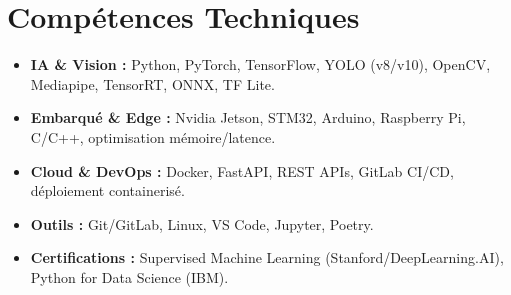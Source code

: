 \documentclass[a4paper,11pt]{article}
\begin{document}
\section{Compétences Techniques}
\begin{itemize}[leftmargin=*, nosep]
    \item \small{\textbf{IA \& Vision :} Python, PyTorch, TensorFlow, YOLO (v8/v10), OpenCV, Mediapipe, TensorRT, ONNX, TF Lite.}
    \item \small{\textbf{Embarqué \& Edge :} Nvidia Jetson, STM32, Arduino, Raspberry Pi, C/C++, optimisation mémoire/latence.}
    \item \small{\textbf{Cloud \& DevOps :} Docker, FastAPI, REST APIs, GitLab CI/CD, déploiement containerisé.}
    \item \small{\textbf{Outils :} Git/GitLab, Linux, VS Code, Jupyter, Poetry.}
    \item \small{\textbf{Certifications :} Supervised Machine Learning (Stanford/DeepLearning.AI), Python for Data Science (IBM).}
\end{itemize}

\end{document}
